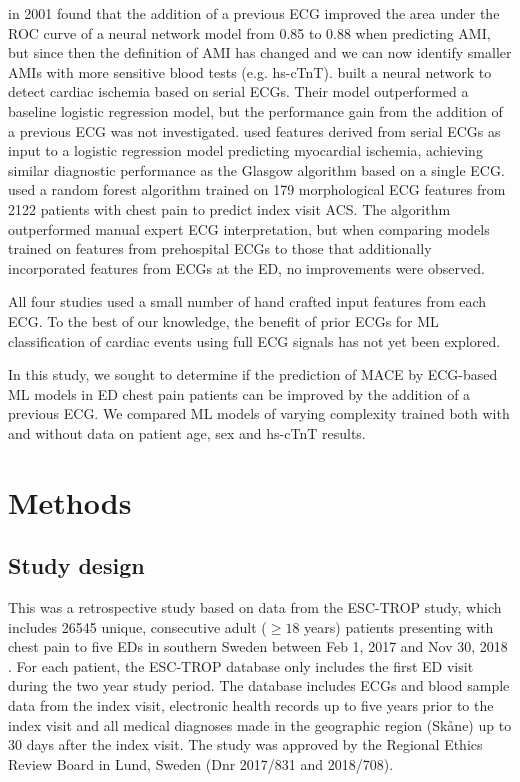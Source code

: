 \documentclass[preprint]{elsarticle}
\begin{document}
\citet{ohlsson2001} in 2001 found that the addition of a previous ECG improved the area under the ROC curve of a neural network model from 0.85 to 0.88 when predicting AMI, but since then the definition of AMI has changed and we can now identify smaller AMIs with more sensitive blood tests (e.g. hs-cTnT). \citet{sbrollini2019} built a neural network to detect cardiac ischemia based on serial ECGs. Their model outperformed a baseline logistic regression model, but the performance gain from the addition of a previous ECG was not investigated. \citet{terhaar2019} used features derived from serial ECGs as input to a logistic regression model predicting myocardial ischemia, achieving similar diagnostic performance as the Glasgow algorithm based on a single ECG. \citet{bouzid2023} used a random forest algorithm trained on 179 morphological ECG features from 2122 patients with chest pain to predict index visit ACS. The algorithm outperformed manual expert ECG interpretation, but when comparing models trained on features from prehospital ECGs to those that additionally incorporated features from ECGs at the ED, no improvements were observed. 



All four studies used a small number of hand crafted input features from each ECG. To the best of our knowledge, the benefit of prior ECGs for ML classification of cardiac events using full ECG signals has not yet been explored.

In this study, we sought to determine if the prediction of MACE by ECG-based ML models in ED chest pain patients can be improved by the addition of a previous ECG. We compared ML models of varying complexity trained both with and without data on patient age, sex and hs-cTnT results.

\section{Methods}
\subsection{Study design}
This was a retrospective study based on data from the ESC-TROP study, which includes 26545 unique, consecutive adult ($\geq 18$ years) patients presenting with chest pain to five EDs in southern Sweden between Feb 1, 2017 and Nov 30, 2018 \citep{mokhtari2020}. For each patient, the ESC-TROP database only includes the first ED visit during the two year study period. The database includes ECGs and blood sample data from the index visit, electronic health records up to five years prior to the index visit and all medical diagnoses made in the geographic region (Sk\aa{}ne) up to 30 days after the index visit. The study was approved by the Regional Ethics Review Board in Lund, Sweden (Dnr 2017/831 and 2018/708). 
\end{document}
